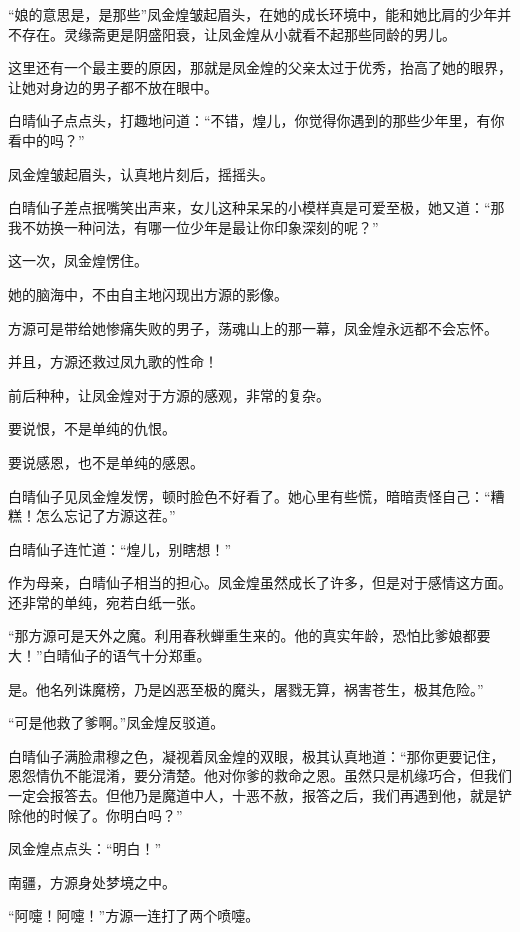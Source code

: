 
\begin{this_body}

“娘的意思是，是那些”凤金煌皱起眉头，在她的成长环境中，能和她比肩的少年并不存在。灵缘斋更是阴盛阳衰，让凤金煌从小就看不起那些同龄的男儿。

这里还有一个最主要的原因，那就是凤金煌的父亲太过于优秀，抬高了她的眼界，让她对身边的男子都不放在眼中。

白晴仙子点点头，打趣地问道：“不错，煌儿，你觉得你遇到的那些少年里，有你看中的吗？”

凤金煌皱起眉头，认真地片刻后，摇摇头。

白晴仙子差点抿嘴笑出声来，女儿这种呆呆的小模样真是可爱至极，她又道：“那我不妨换一种问法，有哪一位少年是最让你印象深刻的呢？”

这一次，凤金煌愣住。

她的脑海中，不由自主地闪现出方源的影像。

方源可是带给她惨痛失败的男子，荡魂山上的那一幕，凤金煌永远都不会忘怀。

并且，方源还救过凤九歌的性命！

前后种种，让凤金煌对于方源的感观，非常的复杂。

要说恨，不是单纯的仇恨。

要说感恩，也不是单纯的感恩。

白晴仙子见凤金煌发愣，顿时脸色不好看了。她心里有些慌，暗暗责怪自己：“糟糕！怎么忘记了方源这茬。”

白晴仙子连忙道：“煌儿，别瞎想！”

作为母亲，白晴仙子相当的担心。凤金煌虽然成长了许多，但是对于感情这方面。还非常的单纯，宛若白纸一张。

“那方源可是天外之魔。利用春秋蝉重生来的。他的真实年龄，恐怕比爹娘都要大！”白晴仙子的语气十分郑重。

是。他名列诛魔榜，乃是凶恶至极的魔头，屠戮无算，祸害苍生，极其危险。”

“可是他救了爹啊。”凤金煌反驳道。

白晴仙子满脸肃穆之色，凝视着凤金煌的双眼，极其认真地道：“那你更要记住，恩怨情仇不能混淆，要分清楚。他对你爹的救命之恩。虽然只是机缘巧合，但我们一定会报答去。但他乃是魔道中人，十恶不赦，报答之后，我们再遇到他，就是铲除他的时候了。你明白吗？”

凤金煌点点头：“明白！”

南疆，方源身处梦境之中。

“阿嚏！阿嚏！”方源一连打了两个喷嚏。


\end{this_body}
